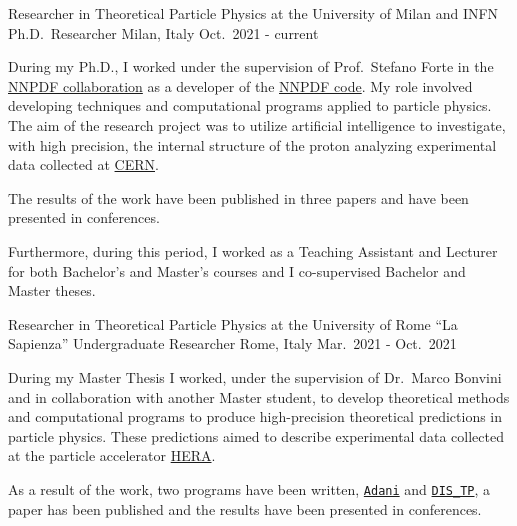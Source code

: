 

\begin{cventries}

  \cventry
  {Researcher in Theoretical Particle Physics at the University of Milan and INFN}
  {Ph.D.\ Researcher}
  {Milan, Italy}
  {Oct.\ 2021 - current}
  {
      \begin{cvitems} %
        \item During my Ph.D., I worked under the supervision of Prof.\ Stefano Forte in the \href{https://nnpdf.mi.infn.it}{NNPDF collaboration} as a developer of the \href{https://github.com/NNPDF}{NNPDF code}.
        My role involved developing techniques and computational programs applied to particle physics.
        The aim of the research project was to utilize artificial intelligence to investigate, with high precision,
        the internal structure of the proton analyzing experimental data collected at \href{https://home.cern}{CERN}.
        \item The results of the work have been published in three papers and have been presented in conferences.
        \item Furthermore, during this period, I worked as a Teaching Assistant and Lecturer for both Bachelor's and Master's courses
        and I co-supervised Bachelor and Master theses. 
      \end{cvitems}
    }

    \cventry
{Researcher in Theoretical Particle Physics at the University of Rome ``La Sapienza''}
{Undergraduate Researcher}
{Rome, Italy}
{Mar.\ 2021 - Oct.\ 2021}
{
      \begin{cvitems} %
        \item During my Master Thesis I worked, under the supervision of Dr.\ Marco Bonvini and in collaboration with another Master student,
        to develop theoretical methods and computational programs to produce high-precision theoretical predictions in particle physics.
        These predictions aimed to describe experimental data collected at the particle accelerator \href{https://en.wikipedia.org/wiki/HERA_(particle_accelerator)}{HERA}.
        \item As a result of the work, two programs have been written, \href{https://github.com/niclaurenti/adani}{\texttt{Adani}} and \href{https://github.com/andreab1997/DIS_TP}{\texttt{DIS\_TP}},
        a paper has been published and the results have been presented in conferences.
      \end{cvitems}
    }


\end{cventries}